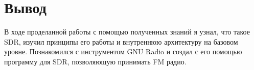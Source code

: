 \chapter{Вывод}
\label{ch:chap3}

В ходе проделанной работы с помощью полученных знаний я узнал, что такое SDR, изучил принципы его работы и внутреннюю архитектуру на базовом уровне.  
Познакомился с инструментом GNU Radio и создал с его помощью программу для SDR, позволяющую принимать FM радио.  

\endinput